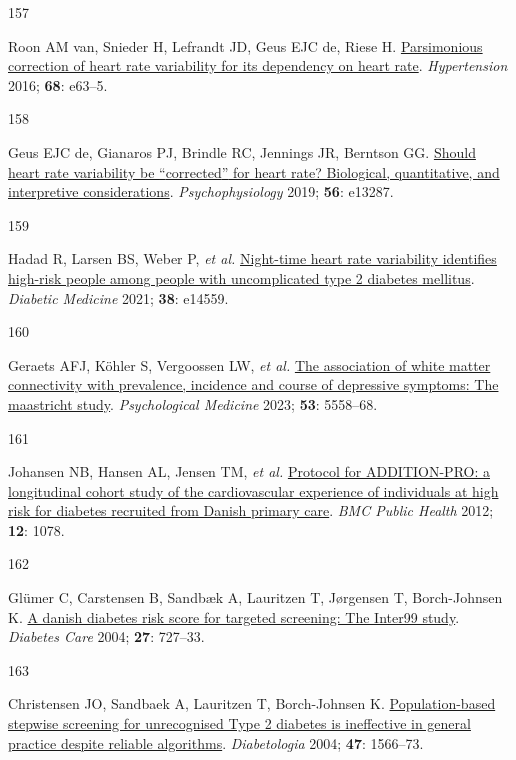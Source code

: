 \documentclass[
  a4paper,
  headsepline=true,
  open=left]{scrbook}
\newlength{\cslhangindent}
\newlength{\csllabelwidth}
\newlength{\cslentryspacingunit} %
\newenvironment{CSLReferences}[2] %
 {%
  \setlength{\parindent}{0pt}
  \ifodd #1
  \let\oldpar\par
  \def\par{\hangindent=\cslhangindent\oldpar}
  \fi
  \setlength{\parskip}{#2\cslentryspacingunit}
 }%
 {}
\newcommand{\CSLLeftMargin}[1]{\parbox[t]{\csllabelwidth}{#1}}
\newcommand{\CSLRightInline}[1]{\parbox[t]{\linewidth - \csllabelwidth}{#1}\break}
\begin{document}
\begin{CSLReferences}{0}{0}
\leavevmode{}%
\CSLLeftMargin{157 }%
\CSLRightInline{Roon AM van, Snieder H, Lefrandt JD, Geus EJC de, Riese
H. \href{https://doi.org/10.1161/HYPERTENSIONAHA.116.08053}{Parsimonious
correction of heart rate variability for its dependency on heart rate}.
\emph{Hypertension} 2016; \textbf{68}: e63--5.}

\leavevmode{}%
\CSLLeftMargin{158 }%
\CSLRightInline{Geus EJC de, Gianaros PJ, Brindle RC, Jennings JR,
Berntson GG. \href{https://doi.org/10.1111/psyp.13287}{Should heart rate
variability be {``}corrected{''} for heart rate? Biological,
quantitative, and interpretive considerations}. \emph{Psychophysiology}
2019; \textbf{56}: e13287.}

\leavevmode{}%
\CSLLeftMargin{159 }%
\CSLRightInline{Hadad R, Larsen BS, Weber P, \emph{et al.}
\href{https://doi.org/10.1111/dme.14559}{Night-time heart rate
variability identifies high-risk people among people with uncomplicated
type 2 diabetes mellitus}. \emph{Diabetic Medicine} 2021; \textbf{38}:
e14559.}

\leavevmode{}%
\CSLLeftMargin{160 }%
\CSLRightInline{Geraets AFJ, Köhler S, Vergoossen LW, \emph{et al.}
\href{https://doi.org/10.1017/S0033291722002768}{The association of
white matter connectivity with prevalence, incidence and course of
depressive symptoms: The maastricht study}. \emph{Psychological
Medicine} 2023; \textbf{53}: 5558--68.}

\leavevmode{}%
\CSLLeftMargin{161 }%
\CSLRightInline{Johansen NB, Hansen AL, Jensen TM, \emph{et al.}
\href{https://doi.org/10.1186/1471-2458-12-1078}{Protocol for
ADDITION-PRO: a longitudinal cohort study of the cardiovascular
experience of individuals at high risk for diabetes recruited from
Danish primary care}. \emph{BMC Public Health} 2012; \textbf{12}: 1078.}

\leavevmode{}%
\CSLLeftMargin{162 }%
\CSLRightInline{Glümer C, Carstensen B, Sandbæk A, Lauritzen T,
Jørgensen T, Borch-Johnsen K.
\href{https://doi.org/10.2337/diacare.27.3.727}{A danish diabetes risk
score for targeted screening: The Inter99 study}. \emph{Diabetes Care}
2004; \textbf{27}: 727--33.}

\leavevmode{}%
\CSLLeftMargin{163 }%
\CSLRightInline{Christensen JO, Sandbaek A, Lauritzen T, Borch-Johnsen
K. \href{https://doi.org/10.1007/s00125-004-1496-2}{Population-based
stepwise screening for unrecognised Type 2 diabetes is ineffective in
general practice despite reliable algorithms}. \emph{Diabetologia} 2004;
\textbf{47}: 1566--73.}


\end{CSLReferences}
\end{document}
